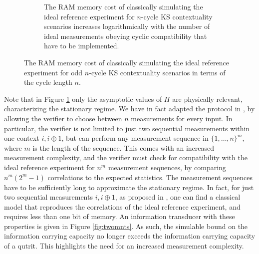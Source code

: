 \begin{figure}
\begin{subfigure}{\textwidth}
            \caption{The RAM memory cost of classically simulating the ideal reference experiment for $n$-cycle KS contextuality scenarios increases logarithmically with the number of ideal measurements obeying cyclic compatibility that have to be implemented.}
        \end{subfigure}
        \caption{The RAM memory cost of classically simulating the ideal reference experiment for odd $n$-cycle KS contextuality scenarios in terms of the cycle length $n$.}
        \label{fig:ncycleRAM}
\end{figure}

Note that in Figure \ref{fig:ncycleRAM} only the asymptotic values of $H$ are physically relevant, characterizing the stationary regime. We have in fact adapted the protocol in \cite{Bharti2019}, by allowing the verifier to choose between $n$ measurements for every input. In particular, the verifier is not limited to just two sequential measurements within one context $i,i\oplus 1$, but can perform any measurement sequence in $\{1,\dots,n\}^m$, where $m$ is the length of the sequence. This comes with an increased measurement complexity, and the verifier must check for compatibility with the ideal reference experiment for $n^m$ measurement sequences, by comparing $n^m(2^m-1)$ correlations to the expected statistics. The measurement sequences have to be sufficiently long to approximate the stationary regime. In fact, for just two sequential measurements $i,i\oplus 1$, as proposed in \cite{Bharti2019}, one can find a classical model that reproduces the correlations of the ideal reference experiment, and requires less than one bit of memory. An information transducer with these properties is given in Figure \ref{fig:twomnts}. As such, the simulable bound on the information carrying capacity no longer exceeds the information carrying capacity of a qutrit. This highlights the need for an increased measurement complexity.

